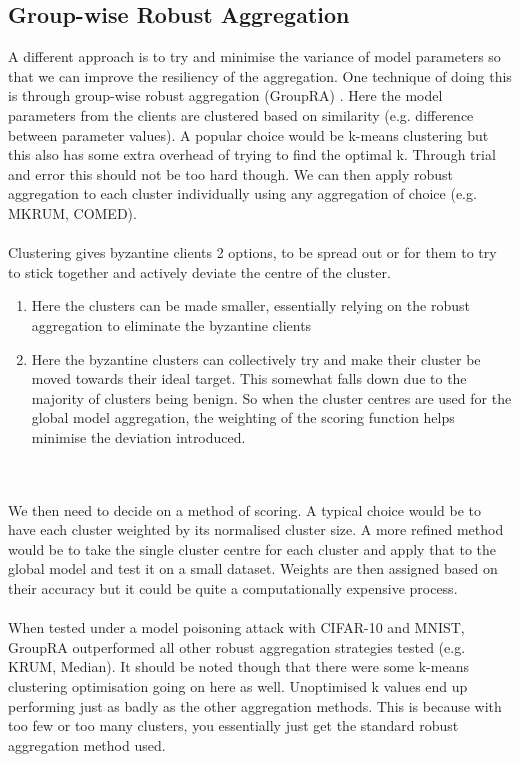 \subsection{Group-wise Robust Aggregation}
A different approach is to try and minimise the variance of model parameters so that we can improve the resiliency of the aggregation.
One technique of doing this is through group-wise robust aggregation (GroupRA) \cite{cluster_robagg}.
Here the model parameters from the clients are clustered based on similarity (e.g. difference between parameter values).
A popular choice would be k-means clustering but this also has some extra overhead of trying to find the optimal k.
Through trial and error this should not be too hard though.
We can then apply robust aggregation to each cluster individually using any aggregation of choice (e.g. MKRUM, COMED).
\\ \\
Clustering gives byzantine clients 2 options, to be spread out or for them to try to stick together and actively deviate the centre of the cluster.
\begin{enumerate}
    \item Here the clusters can be made smaller, essentially relying on the robust aggregation to eliminate the byzantine clients
    
    \item Here the byzantine clusters can collectively try and make their cluster be moved towards their ideal target.
    This somewhat falls down due to the majority of clusters being benign.
    So when the cluster centres are used for the global model aggregation, the weighting of the scoring function helps minimise the deviation introduced.
\end{enumerate}
\\ \\
We then need to decide on a method of scoring.
A typical choice would be to have each cluster weighted by its normalised cluster size.
A more refined method would be to take the single cluster centre for each cluster and apply that to the global model and test it on a small dataset.
Weights are then assigned based on their accuracy but it could be quite a computationally expensive process.
\\ \\
When tested under a model poisoning attack with CIFAR-10 and MNIST, GroupRA outperformed all other robust aggregation strategies tested (e.g. KRUM, Median). 
It should be noted though that there were some k-means clustering optimisation going on here as well.
Unoptimised k values end up performing just as badly as the other aggregation methods.
This is because with too few or too many clusters, you essentially just get the standard robust aggregation method used.

